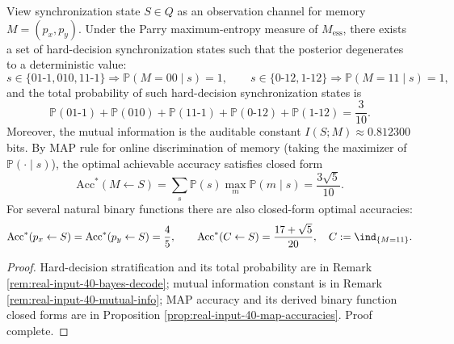 \begin{conclusion}\label{con:xi-terminal-sync-memory-hard-decision-map-accuracy}
View synchronization state \(S\in Q\) as an observation channel for memory \(M=(p_x,p_y)\).
Under the Parry maximum-entropy measure of \(M_{\mathrm{ess}}\), there exists a set of hard-decision synchronization states such that the posterior degenerates to a deterministic value:
\[
s\in\{01\text{-}1,010,11\text{-}1\}\Rightarrow \mathbb{P}(M=00\mid s)=1,
\qquad
s\in\{0\text{-}12,1\text{-}12\}\Rightarrow \mathbb{P}(M=11\mid s)=1,
\]
and the total probability of such hard-decision synchronization states is
\[
\mathbb{P}(01\text{-}1)+\mathbb{P}(010)+\mathbb{P}(11\text{-}1)+\mathbb{P}(0\text{-}12)+\mathbb{P}(1\text{-}12)=\frac{3}{10}.
\]
Moreover, the mutual information is the auditable constant
\(
I(S;M)\approx 0.812300
\) bits.
By MAP rule for online discrimination of memory (taking the maximizer of \(\mathbb{P}(\cdot\mid s)\)), the optimal achievable accuracy satisfies closed form
\[
\mathrm{Acc}^*(M\leftarrow S)=\sum_s \mathbb{P}(s)\max_m \mathbb{P}(m\mid s)=\frac{3\sqrt5}{10}.
\]
For several natural binary functions there are also closed-form optimal accuracies:
\[
\mathrm{Acc}^*(p_x\leftarrow S)=\mathrm{Acc}^*(p_y\leftarrow S)=\frac45,
\qquad
\mathrm{Acc}^*(C\leftarrow S)=\frac{17+\sqrt5}{20},
\quad
C:=\ind_{\{M=11\}}.
\]
\end{conclusion}
\begin{proof}[Proof]
Hard-decision stratification and its total probability are in Remark \ref{rem:real-input-40-bayes-decode}; mutual information constant is in Remark \ref{rem:real-input-40-mutual-info};
MAP accuracy and its derived binary function closed forms are in Proposition \ref{prop:real-input-40-map-accuracies}. Proof complete.
\end{proof}

